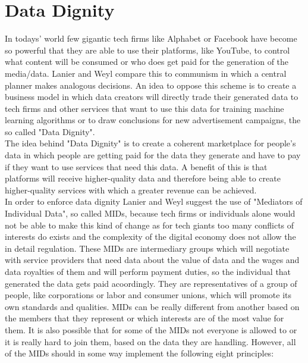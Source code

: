 \documentclass[a4paper,12pt]{report}
\begin{document}
	\section[Data Dignity]{Data Dignity \cite{LanierWeylBlueprint}}
	\startsection
		In todays' world few gigantic tech firms like Alphabet or Facebook have become so powerful that they are able to use their platforms, like YouTube, to control what content will be consumed or who does get paid for the generation of the media/data. Lanier and Weyl compare this to communism in which a central planner makes analogous decisions. An idea to oppose this scheme is to create a business model in which data creators will directly trade their generated data to tech firms and other services that want to use this data for training machine learning algorithms or to draw conclusions for new advertisement campaigns, the so called "Data Dignity". \\
		The idea behind "Data Dignity" is to create a coherent marketplace for people's data in which people are getting paid for the data they generate and have to pay if they want to use services that need this data. A benefit of this is that platforms will receive higher-quality data and therefore being able to create higher-quality services with which a greater revenue can be achieved. \\
		In order to enforce data dignity Lanier and Weyl suggest the use of "Mediators of Individual Data", so called MIDs, because tech firms or individuals alone would not be able to make this kind of change as for tech giants too many conflicts of interests do exists and the complexity of the digital economy does not allow the in detail regulation. These MIDs are intermediary groups which will negotiate with service providers that need data about the value of data and the wages and data royalties of them and will perform payment duties, so the individual that generated the data gets paid acoordingly. They are representatives of a group of people, like corporations or labor and consumer unions, which will promote its own standards and qualities. MIDs can be really different from another based on the members that they represent or which interests are of the most value for them. It is also possible that for some of the MIDs not everyone is allowed to or it is really hard to join them, based on the data they are handling. However, all of the MIDs should in some way implement the following eight principles:
\end{document}
